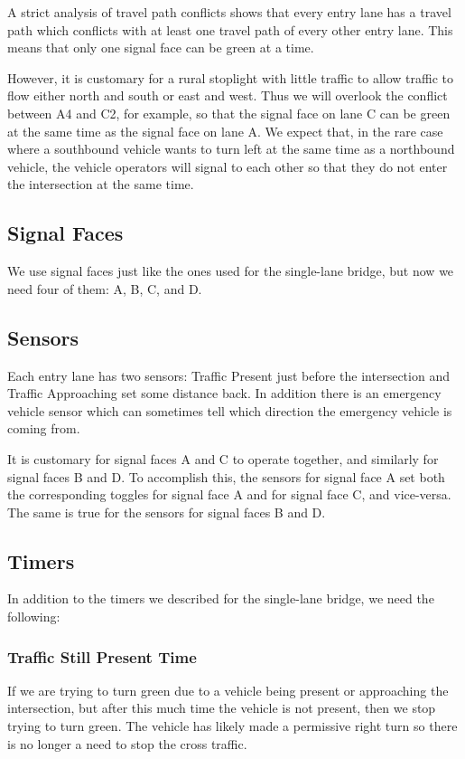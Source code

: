 \documentclass[letterpaper,twoside]{article}
\begin{document}
A strict analysis of travel path conflicts shows that every entry lane
has a travel path which conflicts with at least one travel path of
every other entry lane.  This means that only one signal face can be
green at a time.

However, it is customary for a rural stoplight with little traffic to allow
traffic to flow either north and south or east and west.  
Thus we will overlook the conflict between A4 and C2, for example, so
that the signal face on lane C can be green at the same time as the
signal face on lane A.  We expect that, in the rare case where a southbound
vehicle wants to turn left at the same time as a northbound vehicle,
the vehicle operators will signal to each other so that they do not
enter the intersection at the same time.

\subsection{Signal Faces}

We use signal faces just like the ones used for the single-lane
bridge, but now we need four of them: A, B, C, and D.

\subsection{Sensors}

Each entry lane has two sensors: Traffic Present just before the intersection
and Traffic Approaching set some distance back.  In addition there is an
emergency vehicle sensor which can sometimes tell which direction
the emergency vehicle is coming from.

It is customary for signal faces A and C to operate together,
and similarly for signal faces B and D.  To accomplish this, the sensors for
signal face A set both the corresponding toggles for signal face A
and for signal face C, and vice-versa.  The same is true for the sensors
for signal faces B and D.

\subsection{Timers}

In addition to the timers we described for the single-lane bridge,
we need the following:

\subsubsection{Traffic Still Present Time}
If we are trying to turn green due to a vehicle being present or approaching
the intersection, but after this much time the vehicle is not present, then
we stop trying to turn green.  The vehicle has likely made a permissive right
turn so there is no longer a need to stop the cross traffic.
\end{document}
